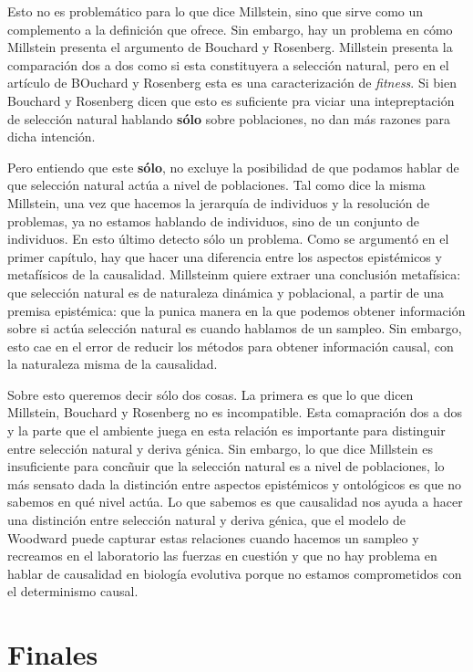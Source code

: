 Esto no es problemático para lo que dice Millstein, sino que sirve como un complemento a la definición que ofrece. Sin embargo, hay un problema en cómo Millstein presenta el argumento de Bouchard y Rosenberg. Millstein presenta la comparación dos a dos como si esta constituyera a selección natural, pero en el artículo de BOuchard y Rosenberg esta es una caracterización de \emph{fitness}. Si bien Bouchard y Rosenberg dicen que esto es suficiente pra viciar una intepreptación de selección natural hablando \textbf{sólo} sobre poblaciones, no dan más razones para dicha intención.

Pero entiendo que este \textbf{sólo}, no excluye la posibilidad de que podamos hablar de que selección natural actúa a nivel de poblaciones. Tal como dice la misma Millstein, una vez que hacemos la jerarquía de individuos y la resolución de problemas, ya no estamos hablando de individuos, sino de un conjunto de individuos. En esto último detecto sólo un problema. Como se argumentó en el primer capítulo, hay que hacer una diferencia entre los aspectos epistémicos y metafísicos de la causalidad. Millsteinm quiere extraer una conclusión metafísica: que selección natural es de naturaleza dinámica y poblacional, a partir de una premisa epistémica: que la punica manera en la que podemos obtener información sobre si actúa selección natural es cuando hablamos de un sampleo. Sin embargo, esto cae en el error de reducir los métodos para obtener información causal, con la naturaleza misma de la causalidad.

Sobre esto queremos decir sólo dos cosas. La primera es que lo que dicen Millstein, Bouchard y Rosenberg no es incompatible. Esta comapración dos a dos y la parte que el ambiente juega en esta relación es importante para distinguir entre selección natural y deriva génica. Sin embargo, lo que dice Millstein es insuficiente para concñuir que la selección natural es a nivel de poblaciones, lo más sensato dada la distinción entre aspectos epistémicos y ontológicos es que no sabemos en qué nivel actúa. Lo que sabemos es que causalidad nos ayuda a hacer una distinción entre selección natural y deriva génica, que el modelo de Woodward puede capturar estas relaciones cuando hacemos un sampleo y recreamos en el laboratorio las fuerzas en cuestión y que no hay problema en hablar de causalidad en biología evolutiva porque no estamos comprometidos con el determinismo causal.




\section{Finales}

